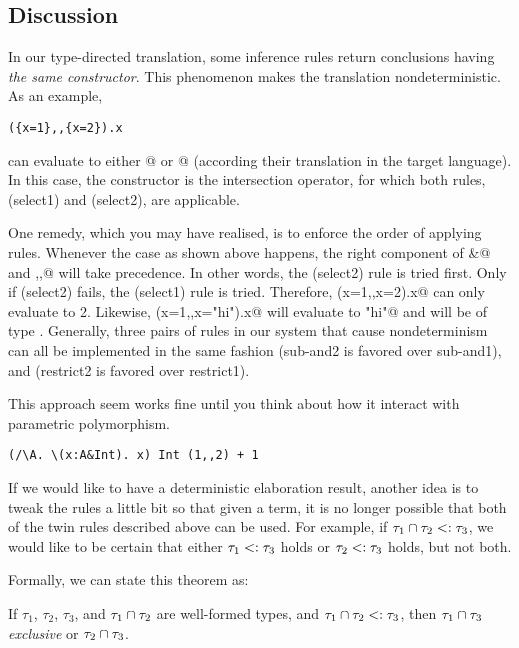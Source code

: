 \documentclass[preprint]{sigplanconf}
\begin{document}
\subsection{Discussion}

In our type-directed translation, some inference rules return conclusions having
\emph{the same constructor}. This phenomenon makes the translation
nondeterministic. As an example,

\begin{lstlisting}
({x=1},,{x=2}).x
\end{lstlisting}

can evaluate to either @ or @ (according their
translation in the target language). In this case, the constructor is the
intersection operator, for which both rules, (select1) and (select2), are
applicable.

One remedy, which you may have realised, is to enforce the order of applying
rules. Whenever the case as shown above happens, the right component of
\lstinline@&@ and \lstinline@,,@ will take precedence. In other words, the
(select2) rule is tried first. Only if (select2) fails, the (select1) rule is
tried. Therefore, \lstinline@({x=1},,{x=2}).x@ can only evaluate to 2. Likewise,
\lstinline@({x=1},,{x="hi"}).x@ will evaluate to \lstinline@"hi"@ and will be of
type \lstinline@String@. Generally, three pairs of rules in our system that
cause nondeterminism can all be implemented in the same fashion (sub-and2 is
favored over sub-and1), and (restrict2 is favored over restrict1).

This approach seem works fine until you think about how it interact with
parametric polymorphism.

\begin{lstlisting}
(/\A. \(x:A&Int). x) Int (1,,2) + 1
\end{lstlisting}

If we would like to have a deterministic elaboration result, another idea is to
tweak the rules a little bit so that given a term, it is no longer possible that
both of the twin rules described above can be used. For example, if
$\tau_1 \cap \tau_2 <:
\tau_3$, we would like to be certain that either $\tau_1 <:
\tau_3$ holds or $\tau_2 <: \tau_3$ holds, but not both.

Formally, we can state this theorem as:

\begin{theorem}
  If $\tau_1$, $\tau_2$, $\tau_3$, and $\tau_1 \cap \tau_2$ are well-formed
  types, and $\tau_1 \cap \tau_2 <: \tau_3$, then $\tau_1 \cap \tau_3$
  \emph{exclusive} or $\tau_2 \cap \tau_3$.
\end{theorem}
\end{document}

